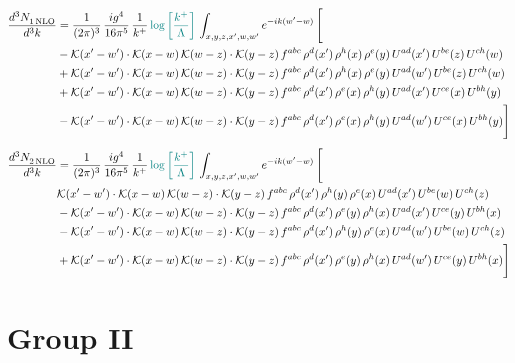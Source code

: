 \documentclass[9pt]{article}
\numberwithin{equation}{section}
\begin{document}
\begin{align}
    \frac{d^{3}N_{1\,\rm NLO}^{\rm}}{d^{3}k}  & = \frac{1}{(2\pi)^{3}}\, \frac{ig^{4}}{16\pi^{5}}\, \frac{1}{k^{+}}\, {\color{teal}\log{\left[\frac{k^{+}}{\Lambda}\right]}}\,\int_{x,y,z,x^{\prime},w,w^{\prime}}e^{-ik(w^{\prime}-w)}\, \Bigg[\notag \\ & -\mathcal{K}(x'-w')\cdot \mathcal{K}(x-w)\, \mathcal{K}(w-z)\cdot \mathcal{K}(y-z)\,f^{abc}\,\rho^{d}(x')\,\rho^{h}(x)\,\rho^{e}(y)\,U^{ad}(x')\,U^{be}(z)\,U^{ch}(w)\notag \\ & + \mathcal{K}(x'-w')\cdot \mathcal{K}(x-w)\, \mathcal{K}(w-z)\cdot \mathcal{K}(y-z)\,f^{abc}\,\rho^{d}(x')\,\rho^{h}(x)\,\rho^{e}(y)\,U^{ad}(w')\,U^{be}(z)\,U^{ch}(w)\notag \\ & +\mathcal{K}(x'-w')\cdot \mathcal{K}(x-w)\, \mathcal{K}(w-z)\cdot \mathcal{K}(y-z)\,f^{abc}\,\rho^{d}(x')\,\rho^{e}(x)\,\rho^{h}(y)\,U^{ad}(x')\,U^{ce}(x)\,U^{bh}(y)\notag \\ & -\mathcal{K}(x'-w')\cdot \mathcal{K}(x-w)\, \mathcal{K}(w-z)\cdot \mathcal{K}(y-z)\,f^{abc}\,\rho^{d}(x')\,\rho^{e}(x)\,\rho^{h}(y)\,U^{ad}(w')\,U^{ce}(x)\,U^{bh}(y) \Bigg]
\end{align}
\begin{align}
    \frac{d^{3}N_{2\,\rm NLO}^{\rm}}{d^{3}k}  & = \frac{1}{(2\pi)^{3}}\, \frac{ig^{4}}{16\pi^{5}}\, \frac{1}{k^{+}}\, {\color{teal}\log{\left[\frac{k^{+}}{\Lambda}\right]}}\,\int_{x,y,z,x^{\prime},w,w^{\prime}}e^{-ik(w^{\prime}-w)}\, \Bigg[\notag \\ & \mathcal{K}(x'-w')\cdot \mathcal{K}(x-w)\, \mathcal{K}(w-z)\cdot \mathcal{K}(y-z)\,f^{abc}\,\rho^{d}(x')\,\rho^{h}(y)\,\rho^{e}(x)\,U^{ad}(x')\,U^{be}(w)\,U^{ch}(z)\notag \\ & - \mathcal{K}(x'-w')\cdot \mathcal{K}(x-w)\, \mathcal{K}(w-z)\cdot \mathcal{K}(y-z)\,f^{abc}\,\rho^{d}(x')\,\rho^{e}(y)\,\rho^{h}(x)\,U^{ad}(x')\,U^{ce}(y)\,U^{bh}(x)\notag \\ & -\mathcal{K}(x'-w')\cdot \mathcal{K}(x-w)\, \mathcal{K}(w-z)\cdot \mathcal{K}(y-z)\,f^{abc}\,\rho^{d}(x')\,\rho^{h}(y)\,\rho^{e}(x)\,U^{ad}(w')\,U^{be}(w)\,U^{ch}(z)\,\notag \\ & + \mathcal{K}(x'-w')\cdot \mathcal{K}(x-w)\, \mathcal{K}(w-z)\cdot \mathcal{K}(y-z)\,f^{abc}\,\rho^{d}(x')\,\rho^{e}(y)\,\rho^{h}(x)\,U^{ad}(w')\,U^{ce}(y)\,U^{bh}(x) \Bigg]
\end{align}
\section{Group II}
\end{document}
